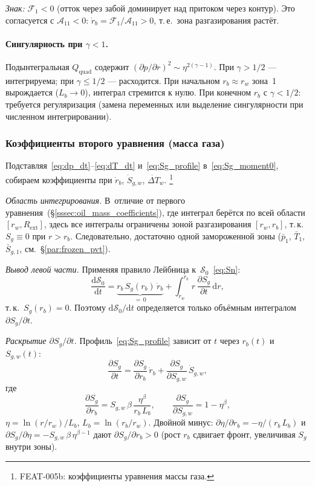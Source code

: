 \documentclass[12pt,a4paper]{article}
\newcommand{\dd}{\mathrm{d}}
\newcommand{\pp}{\partial}
\newcommand{\ext}{\mathrm{ext}}
\begin{document}
\emph{Знак:} $\mathcal{F}_1 < 0$ (отток через забой
доминирует над притоком через контур).
Это согласуется с $\mathcal{A}_{11} < 0$:
$\dot{r}_b = \mathcal{F}_1/\mathcal{A}_{11} > 0$,
т.\,е.\ зона разгазирования растёт.

\paragraph{Сингулярность при $\gamma < 1$.}
Подынтегральная $Q_\text{quad}$ содержит
$(\pp p/\pp r)^2 \sim \eta^{2(\gamma-1)}$. При $\gamma > 1/2$ ---
интегрируема; при $\gamma \leqslant 1/2$ --- расходится.
При начальном $r_b \approx r_w$ зона~1 вырождается
($L_b \to 0$), интеграл стремится к нулю.
При конечном $r_b$ с $\gamma < 1/2$: требуется
регуляризация (замена переменных или выделение
сингулярности при численном интегрировании).

\subsubsection{Коэффициенты второго уравнения (масса газа)}
\label{sssec:gas_mass_coefficients}

Подставляя~\eqref{eq:dp_dt}--\eqref{eq:dT_dt}
и~\eqref{eq:Sg_profile} в~\eqref{eq:Sg_moment0},
собираем коэффициенты при $\dot{r}_b$, $\dot{S}_{g,w}$,
$\dot{\Delta T}_w$.%
\footnote{FEAT-005b: коэффициенты уравнения массы газа.}

\emph{Область интегрирования.}
В~отличие от первого уравнения~(\S\ref{sssec:oil_mass_coefficients}),
где интеграл берётся по всей области $[r_w, R_\ext]$,
здесь все интегралы ограничены зоной разгазирования
$[r_w, r_b]$, т.\,к.\ $S_g \equiv 0$ при $r > r_b$.
Следовательно, достаточно одной замороженной зоны
($\bar{p}_1$, $\bar{T}_1$, $\bar{S}_{g,1}$,
см.~\S\ref{par:frozen_pvt}).

\emph{Вывод левой части.}
Применяя правило Лейбница к~$\mathcal{S}_0$~\eqref{eq:Sn}:
\begin{equation}\label{eq:dS0_dt}
  \frac{\dd\mathcal{S}_0}{\dd t}
  = \underbrace{r_b\,S_g(r_b)\,\dot{r}_b}_{=\,0}
    + \int_{r_w}^{r_b} r\,\frac{\pp S_g}{\pp t}\,\dd r,
\end{equation}
т.\,к.\ $S_g(r_b) = 0$. Поэтому $\dd\mathcal{S}_0/\dd t$
определяется только объёмным интегралом $\pp S_g/\pp t$.

\emph{Раскрытие $\pp S_g / \pp t$.}
Профиль~\eqref{eq:Sg_profile} зависит от $t$ через
$r_b(t)$ и $S_{g,w}(t)$:
\begin{equation}\label{eq:dSg_dt}
  \frac{\pp S_g}{\pp t}
  = \frac{\pp S_g}{\pp r_b}\,\dot{r}_b
    + \frac{\pp S_g}{\pp S_{g,w}}\,\dot{S}_{g,w},
\end{equation}
где
\begin{equation}\label{eq:dSg_drb}
  \frac{\pp S_g}{\pp r_b}
  = S_{g,w}\,\beta\,
    \frac{\eta^\beta}{r_b\,L_b},
  \qquad
  \frac{\pp S_g}{\pp S_{g,w}}
  = 1 - \eta^\beta,
\end{equation}
$\eta = \ln(r/r_w)/L_b$, $L_b = \ln(r_b/r_w)$.
Двойной минус: $\pp\eta/\pp r_b = -\eta/(r_b\,L_b)$
и $\pp S_g/\pp\eta = -S_{g,w}\,\beta\,\eta^{\beta-1}$
дают $\pp S_g / \pp r_b > 0$ (рост $r_b$ сдвигает фронт,
увеличивая $S_g$ внутри зоны).
\end{document}
